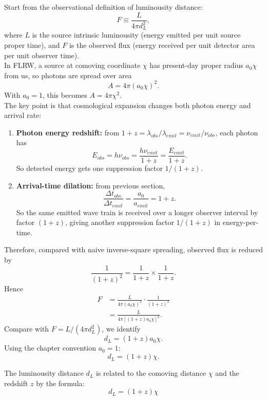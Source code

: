 \bigskip \noindent
\begin{foundation}
  Start from the observational definition of luminousity distance:
  \[
    F \equiv \frac{L}{4\pi d_L^2},
  \]
  where $L$ is the source intrinsic luminousity (energy emitted per unit source proper time), and $F$ is the observed flux (energy received per unit detector area per unit observer time). \\

  In FLRW, a source at comoving coordinate $\chi$ has present-day proper radius $a_0\chi$ from us, so photons are spread over area
  \[
    A = 4\pi (a_0\chi)^2.
  \]
  With $a_0=1$, this becomes $A=4\pi\chi^2$. \\

  The key point is that cosmological expansion changes both photon energy and arrival rate:
  \begin{enumerate}[label=(\roman*)]
    \item \textbf{Photon energy redshift:} from $1+z = \lambda_{obs}/\lambda_{emit} = \nu_{emit}/\nu_{obs}$,
    each photon has
    \[
      E_{obs} = h\nu_{obs} = \frac{h\nu_{emit}}{1+z} = \frac{E_{emit}}{1+z}.
    \]
    So detected energy gets one suppression factor $1/(1+z)$.

    \item \textbf{Arrival-time dilation:} from previous section,
    \[
      \frac{\Delta t_{obs}}{\Delta t_{emit}} = \frac{a_0}{a_{emit}} = 1+z.
    \]
    So the same emitted wave train is received over a longer observer interval by factor $(1+z)$, giving another suppression factor $1/(1+z)$ in energy-per-time.
  \end{enumerate}

  Therefore, compared with naive inverse-square spreading, observed flux is reduced by
  \[
    \frac{1}{(1+z)^2} = \frac{1}{1+z}\times\frac{1}{1+z}.
  \]
  Hence
  \begin{align*}
    F
    &= \frac{L}{4\pi (a_0\chi)^2}\cdot\frac{1}{(1+z)^2} \\
    &= \frac{L}{4\pi\left[(1+z)a_0\chi\right]^2}.
  \end{align*}
  Compare with $F=L/(4\pi d_L^2)$, we identify
  \[
    d_L=(1+z)a_0\chi.
  \]
  Using the chapter convention $a_0=1$:
  \[
    \boxed{d_L=(1+z)\chi.}
  \]
\end{foundation}

\bigskip\noindent
\begin{theory}
    The luminousity distance $d_L$ is related to the comoving distance $\chi$ and the redshift $z$ by the formula:
    \[
        d_L = (1+z) \chi
    \]
\end{theory}

